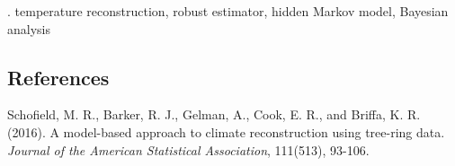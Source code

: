 \documentclass[12pt]{article}
\begin{document}
\vskip 2mm

.
temperature reconstruction, robust estimator, hidden Markov model, Bayesian analysis


%        
%
%        

\subsection*{References}

\begin{description}
\item
Schofield, M. R., Barker, R. J., Gelman, A., Cook, E. R., and Briffa, K. R. (2016). A model-based approach to climate reconstruction using tree-ring data. \textit{Journal of the American Statistical Association}, 111(513), 93-106.
\end{description}
\end{document}
